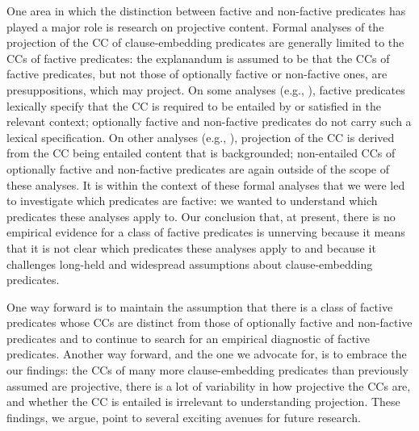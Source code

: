 \documentclass[11pt,fleqn]{article}
\newcommand{\6}{\mbox{$[\hspace*{-.6mm}[$}}
\newcommand{\9}{\mbox{$]\hspace*{-.6mm}]$}}
\begin{document}
{One area in which the distinction between factive and non-factive predicates has played a major role is research on projective content. Formal analyses of the projection of the CC of clause-embedding predicates are generally limited to the CCs of factive predicates: the explanandum is assumed to be that the CCs of factive predicates, but not those of optionally factive or non-factive ones, are presuppositions, which may project. On some analyses (e.g., \citealt{heim83,vds92}), factive predicates lexically specify that the CC is required to be entailed by or satisfied in the relevant context; optionally factive and non-factive predicates do not carry such a lexical specification. On other analyses (e.g., \citealt{abrusan2011,abrusan2016,romoli2015,best-question}), projection of the CC is derived from the CC being entailed content that is backgrounded; non-entailed CCs of optionally factive and non-factive predicates are again outside of the scope of these analyses. It is within the context of these formal analyses that we were led to investigate which predicates are factive: we wanted to understand which predicates these analyses apply to. Our conclusion that, at present, there is no empirical evidence for a class of factive predicates is unnerving because it means that it is not clear which predicates these analyses apply to and because it challenges long-held and widespread assumptions about clause-embedding predicates. 

One way forward is to maintain the assumption that there is a class of factive predicates whose CCs are distinct from those of optionally factive and non-factive predicates and to continue to search for an empirical diagnostic of factive predicates. Another way forward, and the one we advocate for, is to embrace the our findings: the CCs of many more clause-embedding predicates than previously assumed are projective, there is a lot of variability in how projective the CCs are, and whether the CC is entailed is irrelevant to understanding projection. These findings, we argue, point to several exciting avenues for future research. 

}
\end{document}
